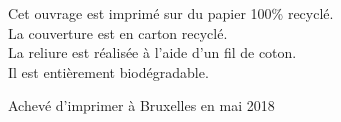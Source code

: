 \begin{center}

    Cet ouvrage est imprimé sur du papier 100\% recyclé.\\
    La couverture est en carton recyclé.\\
    La reliure est réalisée à l'aide d'un fil de coton.\\
    Il est entièrement biodégradable.


    Achevé d'imprimer à Bruxelles en mai 2018


    

\end{center}
